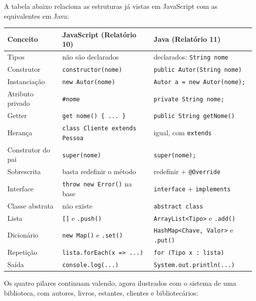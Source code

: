 A tabela abaixo relaciona as estruturas já vistas em JavaScript com as equivalentes em Java:

\begin{center}
\small
\begin{tabular}{|l|l|l|}
\hline
\textbf{Conceito} & \textbf{JavaScript (Relatório 10)} & \textbf{Java (Relatório 11)} \\
\hline
Tipos & não são declarados & declarados: \texttt{String nome} \\
Construtor & \texttt{constructor(nome)} & \texttt{public Autor(String nome)} \\
Instanciação & \texttt{new Autor(nome)} & \texttt{Autor a = new Autor(nome);} \\
Atributo privado & \texttt{\#nome} & \texttt{private String nome;} \\
Getter & \texttt{get nome() \{ ... \}} & \texttt{public String getNome()} \\
Herança & \texttt{class Cliente extends Pessoa} & igual, com \texttt{extends} \\
Construtor do pai & \texttt{super(nome)} & \texttt{super(nome);} \\
Sobrescrita & basta redefinir o método & redefinir + \texttt{@Override} \\
Interface & \texttt{throw new Error()} na base & \texttt{interface} + \texttt{implements} \\
Classe abstrata & não existe & \texttt{abstract class} \\
Lista & \texttt{[]} e \texttt{.push()} & \texttt{ArrayList<Tipo>} e \texttt{.add()} \\
Dicionário & \texttt{new Map()} e \texttt{.set()} & \texttt{HashMap<Chave, Valor>} e \texttt{.put()} \\
Repetição & \texttt{lista.forEach(x => ...)} & \texttt{for (Tipo x : lista)} \\
Saída & \texttt{console.log(...)} & \texttt{System.out.println(...)} \\
\hline
\end{tabular}
\end{center}

Os quatro pilares continuam valendo, agora ilustrados com o sistema de uma biblioteca, com
autores, livros, estantes, clientes e bibliotecários:

